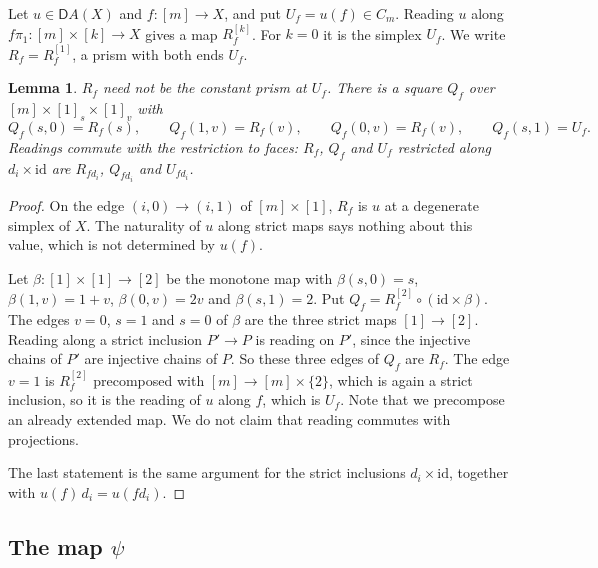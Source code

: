 \documentclass[11pt]{article}
\newcommand{\id}{\mathrm{id}}
\newcommand{\D}{\mathsf{D}}
\theoremstyle{plain}
\newtheorem{lemma}[theorem]{Lemma}
\theoremstyle{definition}
\theoremstyle{remark}
\begin{document}
Let $u\in\D A(X)$ and $f:[m]\to X$, and put $U_f=u(f)\in C_m$. Reading $u$
along $f\pi_1:[m]\times[k]\to X$ gives a map $R_f^{[k]}$. For $k=0$ it is
the simplex $U_f$. We write $R_f=R_f^{[1]}$, a prism with both ends $U_f$.

\begin{lemma}\label{lem:R}
$R_f$ need not be the constant prism at $U_f$. There is a square $Q_f$ over
$[m]\times[1]_s\times[1]_v$ with
\[
Q_f(s,0)=R_f(s),\qquad Q_f(1,v)=R_f(v),\qquad Q_f(0,v)=R_f(v),\qquad
Q_f(s,1)=U_f .
\]
Readings commute with the restriction to faces: $R_f$, $Q_f$ and $U_f$
restricted along $d_i\times\id$ are $R_{fd_i}$, $Q_{fd_i}$ and $U_{fd_i}$.
\end{lemma}

\begin{proof}
On the edge $(i,0)\to(i,1)$ of $[m]\times[1]$, $R_f$ is $u$ at a degenerate
simplex of $X$. The naturality of $u$ along strict maps says nothing about
this value, which is not determined by $u(f)$.

Let $\beta:[1]\times[1]\to[2]$ be the monotone map with $\beta(s,0)=s$,
$\beta(1,v)=1+v$, $\beta(0,v)=2v$ and $\beta(s,1)=2$. Put
$Q_f=R_f^{[2]}\circ(\id\times\beta)$. The edges $v=0$, $s=1$ and $s=0$ of
$\beta$ are the three strict maps $[1]\to[2]$. Reading along a strict
inclusion $P'\to P$ is reading on $P'$, since the injective chains of $P'$
are injective chains of $P$. So these three edges of $Q_f$ are $R_f$. The
edge $v=1$ is $R_f^{[2]}$ precomposed with $[m]\to[m]\times\{2\}$, which is
again a strict inclusion, so it is the reading of $u$ along $f$, which is
$U_f$. Note that we precompose an already extended map. We do not claim
that reading commutes with projections.

The last statement is the same argument for the strict inclusions
$d_i\times\id$, together with $u(f)\,d_i=u(fd_i)$.
\end{proof}

\subsection{The map $\psi$}
\end{document}
